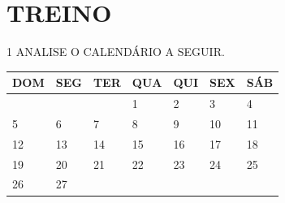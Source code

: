 





\section*{TREINO}

\num{1} ANALISE O CALENDÁRIO A SEGUIR.



\begin{table}[!ht]
    \centering
    \begin{tabular}{|l|l|l|l|l|l|l|}
    \hline
        \textbf{DOM} & \textbf{SEG} & \textbf{TER} & \textbf{QUA} & \textbf{QUI} & \textbf{SEX} & \textbf{SÁB} \\ \hline
        ~ & ~ & ~ & 1 & 2 & 3 & 4 \\ \hline
        5 & 6 & 7 & 8 & 9 & 10 & 11 \\ \hline
        12 & 13 & 14 & 15 & 16 & 17 & 18 \\ \hline
        19 & 20 & 21 & 22 & 23 & 24 & 25 \\ \hline
        26 & 27 & ~ & ~ & ~ & ~ & ~ \\ \hline
    \end{tabular}
\end{table}

